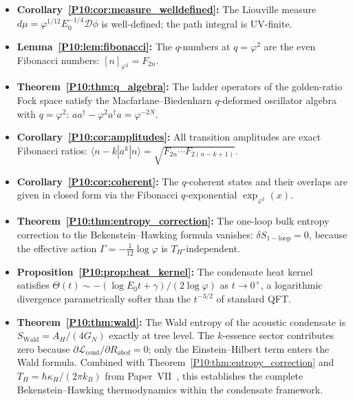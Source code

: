 \documentclass[11pt,a4paper]{article}
\theoremstyle{definition}
\theoremstyle{remark}
\newcommand{\vp}{\varphi}
\newcommand{\dmu}{d\mu}
\begin{document}
\begin{itemize}[itemsep=3pt]
\item \textbf{Corollary~\ref{P10:cor:measure_welldefined}:}
  The Liouville measure $\dmu = \vp^{1/12}E_0^{-1/4}\mathcal{D}\phi$
  is well-defined; the path integral is UV-finite.

\item \textbf{Lemma~\ref{P10:lem:fibonacci}:}
  The $q$-numbers at $q=\vp^2$ are the even Fibonacci numbers:
  $[n]_{\vp^2} = F_{2n}$.

\item \textbf{Theorem~\ref{P10:thm:q_algebra}:}
  The ladder operators of the golden-ratio Fock space satisfy
  the Macfarlane--Biedenharn $q$-deformed oscillator algebra
  with $q=\vp^2$: $aa^\dagger - \vp^2 a^\dagger a = \vp^{-2N}$.

\item \textbf{Corollary~\ref{P10:cor:amplitudes}:}
  All transition amplitudes are exact Fibonacci ratios:
  $\langle n-k|a^k|n\rangle = \sqrt{F_{2n}\cdots F_{2(n-k+1)}}$.

\item \textbf{Corollary~\ref{P10:cor:coherent}:}
  The $q$-coherent states and their overlaps are given in closed
  form via the Fibonacci $q$-exponential $\exp_{\vp^2}(x)$.

\item \textbf{Theorem~\ref{P10:thm:entropy_correction}:}
  The one-loop bulk entropy correction to the Bekenstein--Hawking
  formula vanishes: $\delta S_\mathrm{1-loop} = 0$, because the
  effective action $\Gamma=-\tfrac{1}{12}\log\vp$ is
  $T_H$-independent.

\item \textbf{Proposition~\ref{P10:prop:heat_kernel}:}
  The condensate heat kernel satisfies
  $\Theta(t)\sim-(\log E_0 t+\gamma)/(2\log\vp)$ as $t\to0^+$,
  a logarithmic divergence parametrically softer than the
  $t^{-3/2}$ of standard QFT.

\item \textbf{Theorem~\ref{P10:thm:wald}:}
  The Wald entropy of the acoustic condensate is
  $S_\mathrm{Wald} = A_H/(4G_N)$ exactly at tree level.
  The $k$-essence sector contributes zero because
  $\partial\mathcal{L}_\mathrm{cond}/\partial R_{abcd}=0$;
  only the Einstein--Hilbert term enters the Wald formula.
  Combined with Theorem~\ref{P10:thm:entropy_correction} and
  $T_H=\hbar\kappa_H/(2\pi k_B)$ from Paper~VII~\cite{Paper7},
  this establishes the complete Bekenstein--Hawking thermodynamics
  within the condensate framework.

\end{itemize}
\end{document}
